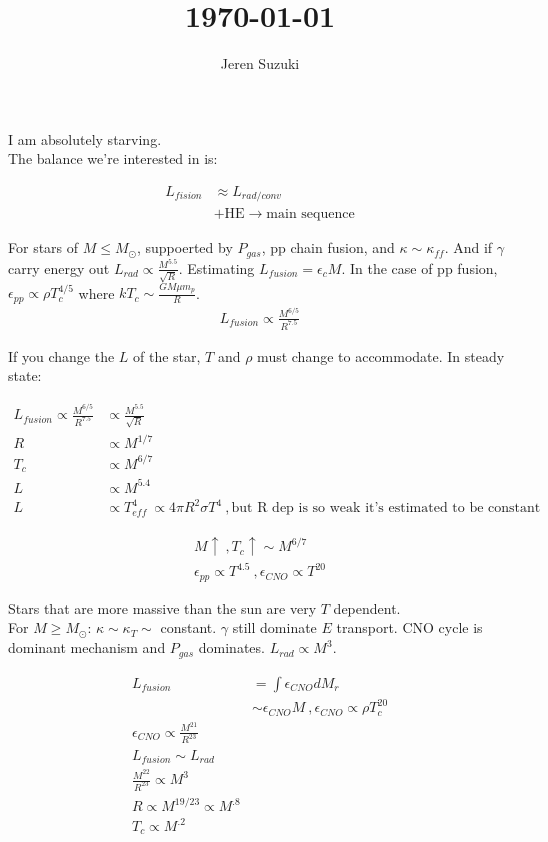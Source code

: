 \documentclass[10pt,a4paper]{article}
\newcommand{\pt}{\propto}
\begin{document}
\title{\today}
\author{\begin{large}Jeren Suzuki\end{large}}

I am absolutely starving.\\

The balance we're interested in is:

\begin{align}
L_{fision} &\approx L_{rad/conv}\\
	& + 	\text{HE}\rightarrow\text{main sequence}
\end{align}

For stars of $M \leq M_\odot$, suppoerted by $P_{gas}$, pp chain fusion, and $\kappa \sim \kappa_{ff}$. And if $\gamma$ carry energy out $L_{rad} \propto \frac{ M^{5.5} }{\sqrt{R}}$. Estimating $L_{fusion} = \epsilon_c M$. In the case of pp fusion, $\epsilon_{pp} \propto \rho T_c^{4/5}$ where $kT_c \sim \frac{GM \mu m_p}{R}$. \\

\begin{align}
L_{fusion} \pt \frac{M^{6/5}}{R^{7.5}}
\end{align}

If you change the $L$ of the star, $T$ and $\rho$ must change to accommodate. In steady state:

\begin{align}
L_{fusion} \pt \frac{M^{6/5}}{R^{7.5}} & \pt \frac{ M^{5.5} }{\sqrt{R}}\\
R & \pt M^{1/7}\\
T_c &\pt M^{6/7}\\
L & \pt M^{5.4}\\
L & \pt T_{eff}^4~ \pt 4\pi R^2\sigma T^4~, \text{but R dep is so weak it's estimated to be constant}
\end{align}

\begin{align}
M \uparrow~,T_c \uparrow \sim M^{6/7}\\
\epsilon_{pp} \pt T^{4.5}~, \epsilon_{CNO} \pt T^{20}
\end{align}

Stars that are more massive than the sun are very $T$ dependent. \\

For $M \geq M_\odot$: $\kappa \sim \kappa_T \sim$ constant. $\gamma$ still dominate $E$ transport. CNO cycle is dominant mechanism and $P_{gas}$ dominates. $L_{rad} \pt M^3$.

\begin{align}
L_{fusion}&  = \int \epsilon_{CNO} dM_r\\
 & \sim \epsilon_{CNO}M~, \epsilon_{CNO} \pt \rho T_c^{20}\\
 \epsilon_{CNO} \pt \frac{M^{21}}{R^{23}}\\
 L_{fusion} \sim L_{rad}\\
  \frac{M^{22}}{R^{23}} \pt M^3\\
  R \pt M^{19/23} \pt M^{.8}\\
  T_c \pt M^{.2}
\end{align}
\end{document}
